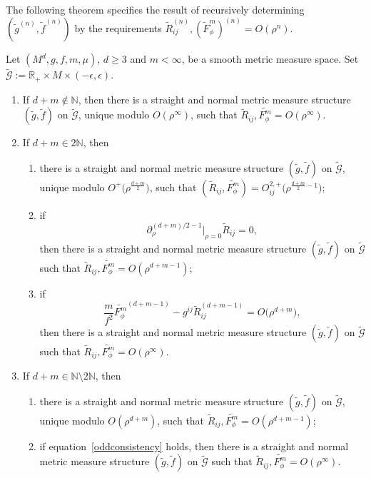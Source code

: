 The following theorem specifies the result of recursively determining $(\widetilde{g}^{(n)},\widetilde{f}^{(n)})$ by the requirements $\widetilde{R}_{ij}^{(n)},(\widetilde{F}_\phi^m)^{(n)}=O(\rho^n)$.
\begin{Theorem}
\label{various-possibilities}
Let $(M^d,g,f,m,\mu)$, $d\geq 3$ and $m<\infty$, be a smooth metric measure space. Set $\widetilde{\mathcal{G}}:=\mathbb{R}_+\times M\times (-\epsilon,\epsilon)$.
\begin{enumerate}[label=$(\roman*)$]\itemsep=0pt
\item If $d+m\notin\mathbb{N}$, then there is a straight and normal metric measure structure $(\widetilde{g},\widetilde{f})$ on $\widetilde{\mathcal{G}}$, unique modulo $O(\rho^\infty)$, such that $\widetilde{R}_{ij},\widetilde{F_\phi^m}=O(\rho^\infty)$.

\item If $d+m\in 2\mathbb{N}$, then
\begin{enumerate}\itemsep=0pt
\item[$(a)$] there is a straight and normal metric measure structure $(\widetilde{g},\widetilde{f})$ on $\widetilde{\mathcal{G}}$, unique modulo $O^+\big(\rho^{\frac{d+m}{2}}\big)$, such that $(\widetilde{R}_{ij},\widetilde{F_\phi^m})=O_{ij}^{2,+}\big(\rho^{\frac{d+m}{2}-1}\big)$;
\item[$(b)$] if
\[
\partial_\rho^{(d+m)/2-1}\big|_{\rho=0}\widetilde{R}_{ij}=0,
\]
then there is a straight and normal metric measure structure $(\widetilde{g},\widetilde{f})$ on $\widetilde{\mathcal{G}}$ such that $\widetilde{R}_{ij},\widetilde{F_\phi^m}=O(\rho^{d+m-1})$;

\item[$(c)$] if
\begin{equation}\label{oddconsistency}
\frac{m}{f^2} \widetilde{F_\phi^m}^{(d+m-1)}-g^{ij}\widetilde{R}_{ij}^{(d+m-1)}=O\big(\rho^{d+m}\big),
\end{equation}
then there is a straight and normal metric measure structure $(\widetilde{g},\widetilde{f})$ on $\widetilde{\mathcal{G}}$ such that $\widetilde{R}_{ij},\widetilde{F_\phi^m}=O(\rho^\infty)$.
\end{enumerate}

\item If $d+m\in \mathbb{N}\setminus 2\mathbb{N}$, then
\begin{enumerate}\itemsep=0pt
\item[$(a)$] there is a straight and normal metric measure structure $(\widetilde{g},\widetilde{f})$ on $\widetilde{\mathcal{G}}$, unique modulo $O(\rho^{d+m})$, such that $\widetilde{R}_{ij},\widetilde{F_\phi^m}=O(\rho^{d+m-1})$;
\item[$(b)$] if equation~\eqref{oddconsistency} holds, then there is a straight and normal metric measure structure $(\widetilde{g},\widetilde{f})$ on $\widetilde{\mathcal{G}}$ such that $\widetilde{R}_{ij},\widetilde{F_\phi^m}=O(\rho^\infty)$.
\end{enumerate}
\end{enumerate}
\end{Theorem}

